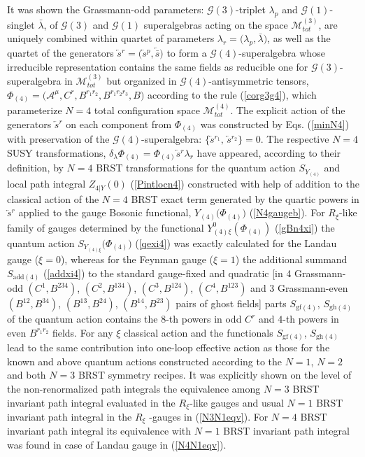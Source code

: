 \documentclass[10pt]{article}
\begin{document}
It was shown the Grassmann-odd parameters: $\mathcal{G}(3)$-triplet $\lambda_p$ and $\mathcal{G}(1)$-singlet  $\bar{\lambda}$,  of  $\mathcal{G}(3)$ and $\mathcal{G}(1)$ superalgebras  acting on  the space $\mathcal{M}^{(3)}_{tot}$, are uniquely combined  within quartet of parameters  $\lambda_r = \big(\lambda_p, \bar{\lambda}\big)$, as well as the quartet of the generators $\overleftarrow{s}{}^r = \big(\overleftarrow{s}{}^p, \overleftarrow{\bar{s}}\big)$  to form   a $\mathcal{G}(4)$-superalgebra  whose irreducible representation contains the same fields as reducible one for $\mathcal{G}(3)$-superalgebra in $\mathcal{M}^{(3)}_{tot}$ but  organized in $\mathcal{G}(4)$-antisymmetric tensors, $\Phi_{(4)} = \big(\mathcal{A}^\mu,C^r, B^{r_1r_2}, B^{r_1r_2r_3},B\big)$ according to the rule (\ref{corg3g4}), which  parameterize   $N=4$ total configuration space $\mathcal{M}^{(4)}_{tot}$. The explicit action of the generators $\overleftarrow{s}{}^r$  on each component from $\Phi_{(4)}$ was constructed by Eqs. (\ref{minN4})  with preservation of the $\mathcal{G}(4)$-superalgebra: $\{\overleftarrow{s}{}^{r_1},\,\overleftarrow{s}{}^{r_2}\}=0$.  The respective $N=4$ SUSY transformations,  $\delta_\lambda \Phi_{(4)} = \Phi_{(4)} \overleftarrow{s}{}^{r} \lambda_r $ have appeared, according to their definition,   by $N=4$ BRST transformations for the quantum action $S_{Y_{(4)}}$ and local path integral  ${Z}_{4|Y}(0)$ (\ref{Pintlocn4})  constructed with help of addition to the classical action of the $N=4$ BRST exact term generated  by the quartic powers in $\overleftarrow{s}{}^{r}$ applied to the gauge Bosonic functional, $Y_{(4)}\big(\Phi_{(4)}\big)$ (\ref{N4gaugeb}).  For $R_\xi$-like family of gauges determined by the functional $Y^0_{(4)\xi}({\Phi}_{(4)})$ (\ref{gBn4xi}) the quantum action $
  S_{Y_{(4)\xi}}\big({\Phi}_{(4)}\big)$  (\ref{qexi4}) was exactly calculated for the Landau gauge ($\xi=0$), whereas for the Feynman gauge ($\xi=1$)  the additional summand $S_{\mathrm{add}(4)}$ (\ref{addxi4}) to the standard gauge-fixed and quadratic [in 4 Grassmann-odd $(C^1, B^{234})$, $(C^2, B^{134})$, $(C^3, B^{124})$, $(C^4, B^{123})$  and 3 Grassmann-even $(B^{12}, B^{34})$, $(B^{13}, B^{24})$, $(B^{14}, B^{23})$  pairs  of ghost fields] parts $S_{\mathrm{gf}(4)}$, $S_{\mathrm{gh}(4)}$ of the quantum action contains the $8$-th  powers in odd $C^r$  and $4$-th powers  in even  $B^{r_1r_2}$ fields. For any $\xi$  classical action and  the functionals $S_{\mathrm{gf}(4)}$, $S_{\mathrm{gh}(4)}$ lead to the same  contribution into one-loop effective action as  those for the known and above quantum actions
  constructed according to the $N=1$, $N=2$ and both $N=3$ BRST symmetry recipes.
It was explicitly  shown on the level of the non-renormalized  path integrals the equivalence among $N=3$ BRST invariant path integral evaluated in the $R_\xi$-like gauges and usual $N=1$ BRST invariant path integral in the $R_\xi$ -gauges in (\ref{N3N1eqv}). For $N=4$ BRST invariant path integral its equivalence with $N=1$ BRST invariant path integral was found in case of Landau gauge in (\ref{N4N1eqv}).
\end{document}
